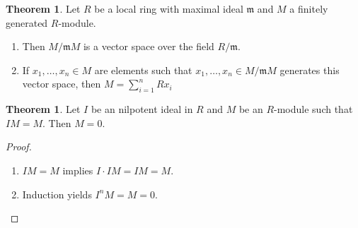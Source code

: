 \documentclass[a4paper]{book}
\theoremstyle{definition}
\newtheorem{theorem}[definition]{Theorem}
\begin{document}
\begin{thmbox}
    \begin{theorem}
        Let \(R\) be a local ring with maximal ideal \(\mathfrak{m}\) and \(M\) a finitely generated \(R\)-module. 
        \begin{enumerate}
            \item Then \(M/\mathfrak{m}M\) is a vector space over the field \(R/\mathfrak{m}\).
            \item If \(x_1, \ldots, x_n \in M\) are elements such that \(x_1, \ldots, x_n \in M/\mathfrak{m}M\) generates this vector space, then \(M = \sum_{i=1}^n Rx_i\)
        \end{enumerate}
    \end{theorem}
\end{thmbox}


\begin{thmbox}
    \begin{theorem}
        Let \(I\) be an nilpotent ideal in \(R\) and \(M\) be an \(R\)-module such that \(IM = M\). Then \(M = 0\).
    \end{theorem}
\end{thmbox}
\begin{proof}
    \begin{enumerate}
        \item \(IM = M\) implies \(I \cdot IM = IM = M\).
        \item Induction yields \(I^n M = M = 0\).
    \end{enumerate}
\end{proof}
\end{document}

